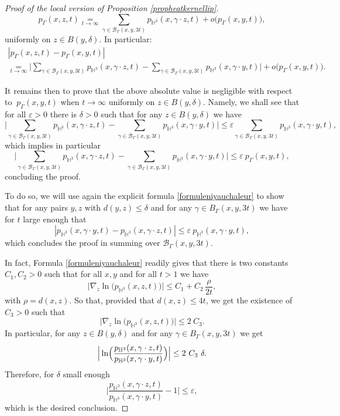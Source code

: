 \documentclass[10pt]{amsart}
\let\mathcal\mathscr
\let\epsilon\varepsilon
\theoremstyle{plain}
\theoremstyle{definition}
\newcommand{\HH}{\mathbb{H}}
\newcommand{\somme}[1]{\sum_{#1}}
\begin{document}
\begin{proof}[Proof of the local version of Proposition \ref{propheatkernellip}]
\[
p_{\Gamma}(x,z,t) \underset{t \to \infty} = \somme{ \gamma \in \mathcal{B}_{\Gamma}(x,y,3t) } p_{\HH^3}(x, \gamma \cdot z,t) + o \bigl(p_{\Gamma}(x,y,t) \bigr),
\]
uniformly on $z \in B(y,\delta)$. In particular:
\begin{multline*}
| p_{\Gamma}(x,z,t) - p_{\Gamma}(x,y,t) |\\
\underset{t \to \infty}{=}\biggl| \somme{ \gamma \in \mathcal{B}_{\Gamma}(x,y,3t) } p_{\HH^3}(x, \gamma \cdot z,t) - \somme{ \gamma \in \mathcal{B}_{\Gamma}(x,y,3t) } p_{\HH^3}(x, \gamma \cdot y,t) \biggr| + o \bigl(p_{\Gamma}(x,y,t) \bigr).
\end{multline*}

It remains then to prove that the above absolute value is negligible with respect to $\ p_{\Gamma}(x,y,t)$ when $t \to \infty$ uniformly on $z \in B(y,\delta)$. Namely, we shall see that for all $\epsilon > 0$ there is $\delta > 0$ such that for any $z \in B(y, \delta)$ we have
\[
\biggl| \somme{ \gamma \in \mathcal{B}_{\Gamma}(x,y,3t) } p_{\HH^3}(x, \gamma \cdot z,t) - \somme{ \gamma \in \mathcal{B}_{\Gamma}(x,y,3t) } p_{\HH^3}(x, \gamma \cdot y,t) \biggr| \le \epsilon \somme{ \gamma \in \mathcal{B}_{\Gamma}(x,y,3t) } p_{\HH^3}(x, \gamma \cdot y,t),
\]
which implies in particular
\[
\biggl| \somme{ \gamma \in \mathcal{B}_{\Gamma}(x,y,3t) } p_{\HH^3}(x, \gamma \cdot z,t) - \somme{ \gamma \in \mathcal{B}_{\Gamma}(x,y,3t) } p_{\HH^3}(x, \gamma \cdot y,t) \biggr| \le \epsilon \ p_{\Gamma}(x,y,t),
\]
concluding the proof.

To do so, we will use again the explicit formula \ref{formuleniyauchaleur} to show that for any pairs $y,z$ with $d(y,z) \le \delta$ and for any $\gamma \in B_{\Gamma}(x,y,3t)$ we have for $t$ large enough that
\[
| p_{\HH^3}(x, \gamma \cdot y,t) - p_{\HH^3}(x, \gamma \cdot z,t) | \le \epsilon \ p_{\HH^3}(x, \gamma \cdot y,t),
\]
which concludes the proof in summing over $\mathcal{B}_{\Gamma}(x,y,3t)$.

In fact, Formula \eqref{formuleniyauchaleur} readily gives that there is two constants $C_1, C_2 > 0$ such that for all $x,y$ and for all $t > 1$ we have
\[
\Big| \nabla_z \ln \Big(p_{\HH^3}(x,z,t) \Big) \Big| \le C_1 + C_2 \, \frac{\rho}{2t},
\]
with $\rho = d(x,z)$. So that, provided that $d(x,z) \le 4t$, we get the existence of $C_3 > 0$ such that
\[
\Big| \nabla_z \ln \bigl(p_{\HH^3}(x,z,t) \bigr) \Big| \le 2 \ C_3.
\]
In particular, for any $z \in B(y, \delta)$ and for any $\gamma \in B_{\Gamma}(x,y,3t)$ we get
\[
\Big| \ln \Bigl(\frac{p_{\HH^3}(x,\gamma \cdot z,t)}{p_{\HH^3}(x,\gamma \cdot y,t)} \Bigr) \Big| \le 2 \ C_3 \ \delta.
\]
Therefore, for $\delta$ small enough
\[
\Big| \frac{p_{\HH^3}(x,\gamma \cdot z,t)}{p_{\HH^3}(x,\gamma \cdot y,t)} - 1 \Big| \le \epsilon,
\]
which is the desired conclusion.
\end{proof}
\end{document}
